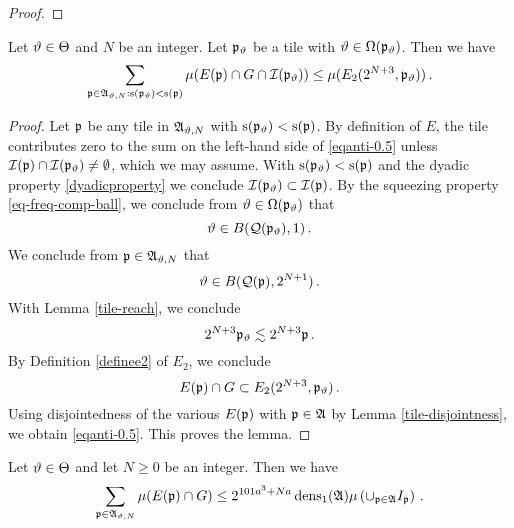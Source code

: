 {\begin{proof}
\end{proof}


\begin{lemma}\label{local-antichain-density}
Let ${\vartheta}\in{\Theta}$ and {$N$} be
an integer. Let ${\mathfrak p}_{{\vartheta}}$ be a tile with ${\vartheta}\in {\Omega}({\mathfrak p}_{{\vartheta}})$.
Then we have
\begin{equation}\label{eqanti-0.5}
    \sum_{{\mathfrak p}\in\mathfrak{A}_{{\vartheta},N}: {\mathrm{s}}({\mathfrak p}_{{\vartheta}})<{\mathrm{s}}({\mathfrak p})}\mu(E({\mathfrak p})\cap G \cap {\mathcal{I}}({\mathfrak p}_{{\vartheta}}))
    \le  \mu (E_2(2^{N+3},{\mathfrak p}_{{\vartheta}}))
 \, .
\end{equation}



\end{lemma}

\begin{proof}


Let ${\mathfrak p}$ be any tile in $\mathfrak{A}_{{\vartheta},N}$ with ${\mathrm{s}}({\mathfrak p}_{{\vartheta}})<{\mathrm{s}}({\mathfrak p})$. By definition of
$E$, the tile contributes zero to the sum on the left-hand side of \eqref{eqanti-0.5} unless
 ${\mathcal{I}}({\mathfrak p})\cap {\mathcal{I}}({\mathfrak p}_{{\vartheta}}) \neq \emptyset$, which we may assume. With ${\mathrm{s}}({\mathfrak p}_{{\vartheta}})<{\mathrm{s}}({\mathfrak p})$
and the dyadic property
\eqref{dyadicproperty} we conclude ${\mathcal{I}}({\mathfrak p}_{{\vartheta}})\subset  {\mathcal{I}}({\mathfrak p})$.
By the squeezing property
\eqref{eq-freq-comp-ball},
we conclude from
${\vartheta}\in {\Omega}({\mathfrak p}_{{\vartheta}})$
that
\begin{equation}
    {\vartheta}\in B({\mathcal{Q}}({\mathfrak p}_{{\vartheta}}), 1)\, .
\end{equation}
We conclude from ${\mathfrak p} \in \mathfrak{A}_{{\vartheta},N}$ that
\begin{equation}
    {\vartheta} \in B({\mathcal{Q}}({\mathfrak p}), 2^{N+1})\, .
\end{equation}
With Lemma \ref{tile-reach}, we conclude
\begin{equation}
    2^{N+3}{\mathfrak p}_{{\vartheta}}  \lesssim  2^{N+3}{\mathfrak p} \, .
\end{equation}
By Definition \eqref{definee2} of $E_2$, we conclude
\begin{equation}
    E({\mathfrak p})\cap G \subset E_2(2^{N+3},{\mathfrak p}_{{\vartheta}})\, .
\end{equation}
Using disjointedness of the various $E({\mathfrak p})$ with ${\mathfrak p}\in \mathfrak{A}$  by Lemma \ref{tile-disjointness}, we obtain \eqref{eqanti-0.5}.
This proves the lemma.
\end{proof}
\begin{lemma}
\label{global-antichain-density}
Let ${\vartheta}\in{\Theta}$ and let $N\ge 0$  be
an integer. Then we have
\begin{equation}\label{eqanti00}
    \sum_{{\mathfrak p}\in\mathfrak{A}_{{\vartheta},N}}\mu(E({\mathfrak p})\cap G)
    \le
 2^{101a^3+Na}\operatorname{\operatorname{dens}}_1(\mathfrak{A})\mu\left(\cup_{{\mathfrak p}\in\mathfrak{A}}I_{{\mathfrak p}}\right)\, .
\end{equation}
\end{lemma}



}
